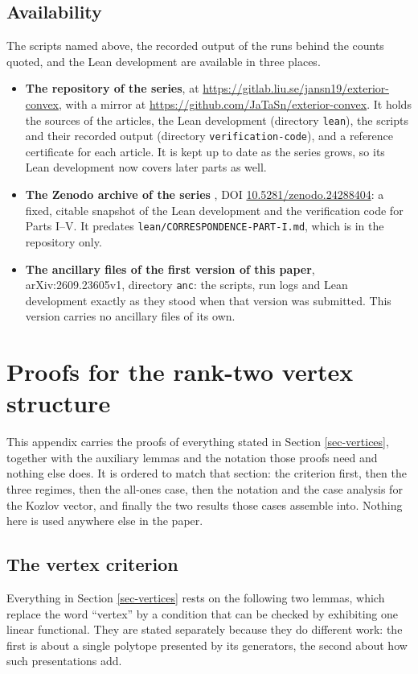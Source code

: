 \documentclass[11pt, a4paper, abstract=yes]{scrartcl}
\theoremstyle{definition}
\theoremstyle{remark}
\theoremstyle{plain}
\let\autocite\cite
\begin{document}
\subsection{Availability}
\label{sec-methods-anc}
The scripts named above, the recorded output of the runs behind the counts quoted, and the Lean
development are available in three places.

\begin{itemize}
\item \raggedright \textbf{The repository of the series}, at
\url{https://gitlab.liu.se/jansn19/exterior-convex}, with a mirror at
\url{https://github.com/JaTaSn/exterior-convex}. It holds the sources of the articles,
the Lean development (directory \texttt{lean}), the scripts and their recorded output (directory
\texttt{verification-code}), and a reference certificate for each article. It is kept up to date as the
series grows, so its Lean development now covers later parts as well.
\item \textbf{The Zenodo archive of the series} \autocite{SnellmanZenodoSeries}, DOI
\href{https://doi.org/10.5281/zenodo.24288404}{10.5281/zenodo.24288404}: a fixed, citable snapshot of
the Lean development and the verification code for Parts I--V. It predates
\texttt{lean/CORRESPONDENCE-PART-I.md}, which is in the repository only.
\item \textbf{The ancillary files of the first version of this paper}, arXiv:2609.23605v1, directory \texttt{anc}:
the scripts, run logs and Lean development exactly as they stood when that version was submitted.
This version carries no ancillary files of its own.
\end{itemize}

\appendix
\section{Proofs for the rank-two vertex structure}
\label{sec-app}
\label{sec:app}
This appendix carries the proofs of everything stated in Section \ref{sec-vertices}, together with
the auxiliary lemmas and the notation those proofs need and nothing else does. It is ordered to
match that section: the criterion first, then the three regimes, then the all-ones case, then the
notation and the case analysis for the Kozlov vector, and finally the two results those cases
assemble into. Nothing here is used anywhere else in the paper.
\subsection{The vertex criterion}
\label{sec-app-criterion}
Everything in Section \ref{sec-vertices} rests on the following two lemmas, which replace the word ``vertex'' by a
condition that can be checked by exhibiting one linear functional. They are stated separately
because they do different work: the first is about a single polytope presented by its generators,
the second about how such presentations add.
\end{document}
